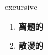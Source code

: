 
\begin{frame}
{\huge excursive}
\begin{center}
\begin{enumerate}\Large
  \item \textbf{离题的}
  \item \textbf{散漫的}
\end{enumerate}
\end{center}
\end{frame}
